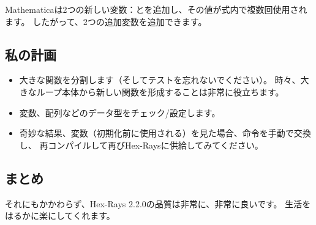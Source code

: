 Mathematicaは2つの新しい変数：とを追加し、その値が式内で複数回使用されます。
したがって、2つの追加変数を追加できます。

\subsection{私の計画}

\begin{itemize}
\item 大きな関数を分割します（そしてテストを忘れないでください）。
時々、大きなループ本体から新しい関数を形成することは非常に役立ちます。

\item 変数、配列などのデータ型をチェック/設定します。

\item 奇妙な結果、変数（初期化前に使用される）を見た場合、命令を手動で交換し、
再コンパイルして再びHex-Raysに供給してみてください。
\end{itemize}

\subsection{まとめ}

それにもかかわらず、Hex-Rays 2.2.0の品質は非常に、非常に良いです。
生活をはるかに楽にしてくれます。